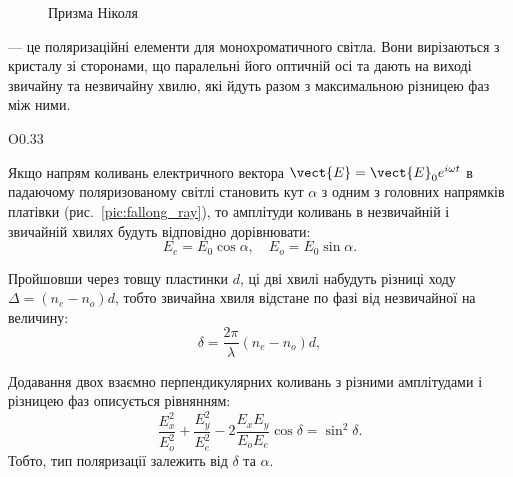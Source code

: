 \begin{figure}[h!]\centering

\caption{Призма Ніколя}
\label{pic:Nicol}
\end{figure}


 --- це поляризаційні елементи для
монохроматичного світла. Вони вирізаються з кристалу зі сторонами, що
паралельні його оптичній осі та дають на виході звичайну та незвичайну
хвилю, які йдуть разом з максимальною різницею фаз між ними.

\begin{wrapfigure}{O}{0.33\linewidth}\centering
\caption{Амплітуди коливань звичайного і незвичайного променів}
\label{pic:fallong_ray}
\end{wrapfigure}
Якщо напрям коливань електричного вектора $ \vect{E} = \vect{E}_0 e^{i\omega t}  $ в падаючому поляризованому світлі становить кут $\alpha$ з одним з головних напрямків платівки (рис.~\ref{pic:fallong_ray}), то амплітуди коливань в незвичайній і звичайній хвилях будуть відповідно дорівнювати:
\begin{equation*}
    E_e = E_0 \cos\alpha,\quad E_o = E_0\sin\alpha.
\end{equation*}


Пройшовши через товщу пластинки $ d $, ці дві хвилі набудуть різниці ходу  $ \Delta = (n_e - n_o) d$, тобто звичайна хвиля відстане по фазі від незвичайної на величину:
\begin{equation}\label{eq:phase_delta}
    \delta = \frac{2\pi}{\lambda} (n_e - n_o) d,
\end{equation}

Додавання двох взаємно перпендикулярних коливань з різними амплітудами і різницею фаз описується рівнянням:
\begin{equation}\label{eq:ellipse_eqn}
    \frac{E_x^2}{E_o^2} + \frac{E_y^2}{E_e^2} - 2\frac{E_xE_y}{E_oE_e}\cos\delta = \sin^2\delta.
\end{equation}
Тобто, тип поляризації залежить від $\delta$ та $ \alpha $.

